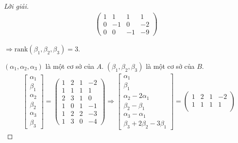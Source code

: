 \documentclass[class=linearalgebra,crop=false]{standalone}
\begin{document}
\begin{proof}[Lời giải]
\begin{align*}
        \begin{pmatrix}
            1 & 1  & 1  & 1  \\
            0 & -1 & 0  & -2 \\
            0 & 0  & -1 & -9
        \end{pmatrix}
    \end{align*}
    \par $\Rightarrow\text{rank}(\beta_{1}, \beta_{2}, \beta_{3}) = 3$.
    \par $(\alpha_{1}, \alpha_{2}, \alpha_{3})$ là một cơ sở của $A$. $(\beta_{1}, \beta_{2}, \beta_{3})$ là một cơ sở của $B$.
    \begin{align*}
                        & \begin{bmatrix}
                              \alpha_{1} \\
                              \beta_{1}  \\
                              \alpha_{2} \\
                              \beta_{2}  \\
                              \alpha_{3} \\
                              \beta_{3}
                          \end{bmatrix}=
        \begin{pmatrix}
            1 & 2 & 1 & -2 \\
            1 & 1 & 1 & 1  \\
            2 & 3 & 1 & 0  \\
            1 & 0 & 1 & -1 \\
            1 & 2 & 2 & -3 \\
            1 & 3 & 0 & -4
        \end{pmatrix}
        \Longrightarrow
        \begin{bmatrix}
            \alpha_{1}               \\
            \beta_{1}                \\
            \alpha_{2} - 2\alpha_{1} \\
            \beta_{2} - \beta_{1}    \\
            \alpha_{3} - \alpha_{1}  \\
            \beta_{3} + 2\beta_{2} - 3\beta_{1}
        \end{bmatrix}=
        \begin{pmatrix}
            1 & 2  & 1  & -2 \\
            1 & 1  & 1  & 1  \\

\end{pmatrix}
\end{align*}
\end{proof}
\end{document}
